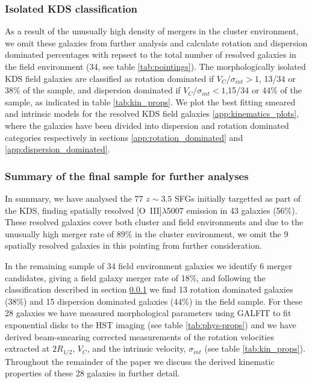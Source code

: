 \documentclass[fleqn,usenatbib]{mn2e}
\begin{document}
\subsubsection{Isolated KDS classification}\label{subsubsection:isolated_classification}
As a result of the unusually high density of mergers in the cluster environment, we omit these galaxies from further analysis and calculate rotation and dispersion dominated percentages with repsect to the total number of resolved galaxies in the field environment (34, see table \ref{tab:pointings}).
The morphologically isolated KDS field galaxies are classified as rotation dominated if $V_{C}/\sigma_{int} > 1$, 13/34 or 38\% of the sample, and dispersion dominated if $V_{C}/\sigma_{int} < 1$,15/34 or 44\% of the sample, as indicated in table \ref{tab:kin_props}.
We plot the best fitting smeared and intrinsic models for the resolved KDS field galaxies \cref{app:kinematics_plots}, where the galaxies have been divided into dispersion and rotation dominated categories respectively in sections \cref{app:rotation_dominated} and \cref{app:dispersion_dominated}.

\subsubsection{Summary of the final sample for further analyses}\label{subsubsec:kin_sample_summary}
In summary, we have analysed the 77 $z\sim3.5$ SFGs initially targetted as part of the KDS, finding spatially resolved [O~{\sc III}]$\lambda$5007 emission in 43 galaxies (56\%).
These resolved galaxies cover both cluster and field environments and due to the unusually high merger rate of 89\% in the cluster environment, we omit the 9 spatially resolved galaxies in this pointing from further consideration.

In the remaining sample of 34 field environment galaxies we identify 6 merger candidates, giving a field galaxy merger rate of 18\%, and following the classification described in section \cref{subsubsection:isolated_classification} we find 13 rotation dominated galaxies (38\%) and 15 dispersion dominated galaxies (44\%) in the field sample.
For these 28 galaxies we have measured morphological parameters using GALFIT to fit exponential disks to the HST imaging (see table \ref{tab:phys-props}) and we have derived beam-smearing corrected measurements of the rotation velocities extracted at $2R_{1/2}$, $V_{C}$, and the intrinsic velocity, $\sigma_{int}$ (see table \ref{tab:kin_props}).
Throughout the remainder of the paper we discuss the derived kinematic properties of these 28 galaxies in further detail.
\end{document}
